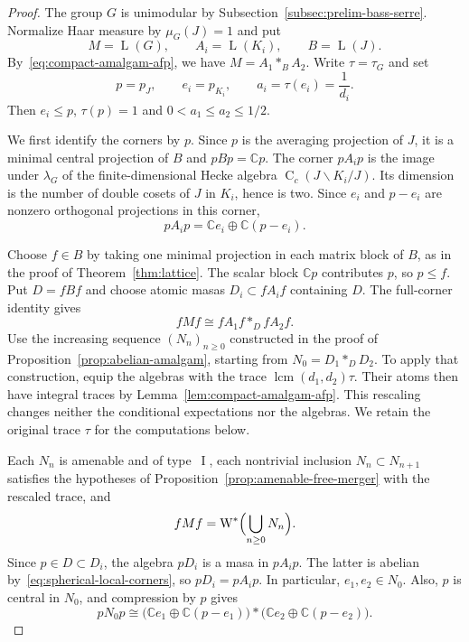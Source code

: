 \documentclass[11pt]{amsart}
\numberwithin{equation}{section}
\newcommand{\cc}{\mathbb C}
\DeclareMathOperator{\LL}{L}
\DeclareMathOperator{\I}{I}
\DeclareMathOperator{\lcm}{lcm}
\newcommand{\Wstar}{\operatorname{W}^*}
\newcommand{\rC}{\operatorname{C}}
\newcommand{\Hk}[2]{\rC_c(#2\backslash #1/#2)}
\theoremstyle{definition}
\begin{document}
\begin{proof}
    The group $G$ is unimodular by Subsection~\ref{subsec:prelim-bass-serre}. Normalize Haar measure by $\mu_G(J)=1$ and put
    $$
        M=\LL(G),\qquad A_i=\LL(K_i),\qquad B=\LL(J).
    $$
    By~\eqref{eq:compact-amalgam-afp}, we have $M=A_1\ast_BA_2$. Write $\tau=\tau_G$ and set
    $$
        p=p_J,\qquad e_i=p_{K_i},\qquad a_i=\tau(e_i)=\frac1{d_i}.
    $$
    Then $e_i\leq p$, $\tau(p)=1$ and $0<a_1\leq a_2\leq1/2$.

    We first identify the corners by $p$. Since $p$ is the averaging projection of $J$, it is a minimal central projection of $B$ and $pBp=\cc p$. The corner $pA_ip$ is the image under $\lambda_G$ of the finite-dimensional Hecke algebra $\Hk {K_i}J$. Its dimension is the number of double cosets of $J$ in $K_i$, hence is two. Since $e_i$ and $p-e_i$ are nonzero orthogonal projections in this corner,
    \begin{equation}\label{eq:spherical-local-corners}
        pA_ip=\cc e_i\oplus\cc(p-e_i).
    \end{equation}

    Choose $f\in B$ by taking one minimal projection in each matrix block of $B$, as in the proof of Theorem~\ref{thm:lattice}. The scalar block $\cc p$ contributes $p$, so $p\leq f$. Put $D=fBf$ and choose atomic masas $D_i\subset fA_if$ containing $D$. The full-corner identity gives
    $$
        fMf\cong fA_1f\ast_DfA_2f.
    $$
    Use the increasing sequence $(N_n)_{n\geq0}$ constructed in the proof of Proposition~\ref{prop:abelian-amalgam}, starting from $N_0=D_1\ast_DD_2$. To apply that construction, equip the algebras with the trace $\lcm(d_1,d_2)\tau$. Their atoms then have integral traces by Lemma~\ref{lem:compact-amalgam-afp}. This rescaling changes neither the conditional expectations nor the algebras. We retain the original trace $\tau$ for the computations below.

    Each $N_n$ is amenable and of type~$\I$, each nontrivial inclusion $N_n\subset N_{n+1}$ satisfies the hypotheses of Proposition~\ref{prop:amenable-free-merger} with the rescaled trace, and
    $$
        fMf=\Wstar\Bigl(\bigcup_{n\geq0}N_n\Bigr).
    $$
    Since $p\in D\subset D_i$, the algebra $pD_i$ is a masa in $pA_ip$. The latter is abelian by~\eqref{eq:spherical-local-corners}, so $pD_i=pA_ip$. In particular, $e_1,e_2\in N_0$. Also, $p$ is central in $N_0$, and compression by $p$ gives
    $$
        pN_0p\cong
        \bigl(\cc e_1\oplus\cc(p-e_1)\bigr)
        \ast\bigl(\cc e_2\oplus\cc(p-e_2)\bigr).
    $$


\end{proof}
\end{document}
